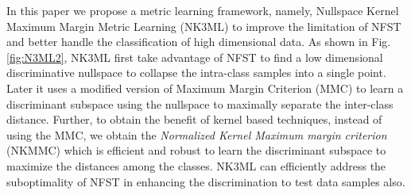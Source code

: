 \documentclass[runningheads]{llncs}
\begin{document}
In this paper we propose a metric learning framework, namely, Nullspace Kernel Maximum Margin Metric Learning (NK3ML) to improve the limitation of NFST and better  handle the classification of high dimensional data. As shown in Fig. \ref{fig:N3ML2}, NK3ML first take advantage of NFST to find a low dimensional discriminative nullspace to collapse the intra-class samples into a single point. Later it uses a modified version of Maximum Margin Criterion (MMC)\cite{haifeng:mmc} to learn a discriminant subspace using the nullspace to maximally separate the inter-class distance.
Further, to obtain the benefit of kernel based techniques, instead of using the MMC, we obtain the                                                                                                                                                                                                                                                                                                                                                                                                                                                                                                                                                                                                                                                                                                                                                                                                                                                                                                                                                                                                                                                                                                                                                                                                                                                                                                                                                                                                                                                                                                                                                                                                                                                                                                                                                                                                                                                                                                                                                                                                                                                                                                                                                                                                                                       \textit{Normalized Kernel Maximum margin criterion} (NKMMC) which is efficient and robust to learn the discriminant subspace to maximize the distances among the classes. NK3ML can efficiently address the suboptimality of NFST in enhancing the discrimination to test data samples also.
\end{document}
